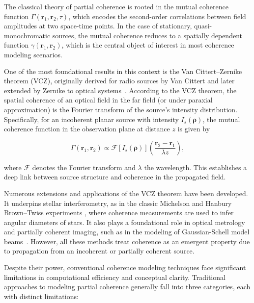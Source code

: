 \documentclass[a4paper,12pt]{article}
\begin{document}
The classical theory of partial coherence is rooted in the mutual coherence function \( \Gamma(\bm{r}_1, \bm{r}_2, \tau) \), 
which encodes the second-order correlations between field amplitudes at two space-time points. In the case of stationary, 
quasi-monochromatic sources, the mutual coherence reduces to a spatially dependent function \( \gamma(\bm{r}_1, \bm{r}_2) \), 
which is the central object of interest in most coherence modeling scenarios.

One of the most foundational results in this context is the Van Cittert–Zernike theorem (VCZ), originally derived for radio 
sources by Van Cittert and later extended by Zernike to optical systems~\cite{vanCittert1934, zernike1938, mandel_wolf}. 
According to the VCZ theorem, 
the spatial coherence of an optical field in the far field (or under paraxial approximation) is the 
Fourier transform of the source's intensity distribution. Specifically, for an incoherent planar source with 
intensity \( I_s(\bm{\rho}) \), the mutual coherence function in the observation plane at distance \( z \) is given by

\begin{equation}
\Gamma(\bm{r}_1, \bm{r}_2) \propto \mathcal{F}\left[ I_s(\bm{\rho}) \right] \left( \frac{\bm{r}_2 - \bm{r}_1}{\lambda z} \right),
\end{equation}

where \( \mathcal{F} \) denotes the Fourier transform and \( \lambda \) the wavelength. This establishes a deep link between 
source structure and coherence in the propagated field.

Numerous extensions and applications of the VCZ theorem have been developed. It underpins stellar interferometry, as in 
the classic Michelson and Hanbury Brown–Twiss experiments \cite{michelson1921, hanburybrown1956}, where coherence measurements are used to infer angular diameters 
of stars. It also plays a foundational role in optical metrology and partially coherent imaging, such as in the modeling of 
Gaussian-Schell model beams~\cite{wolf_josa, goodman}. However, all these methods treat coherence as an emergent property 
due to propagation from an incoherent or partially coherent source.

Despite their power, conventional coherence modeling techniques face significant limitations in computational efficiency 
and conceptual clarity. Traditional approaches to modeling partial coherence generally fall into three categories, each with distinct limitations:
\end{document}
